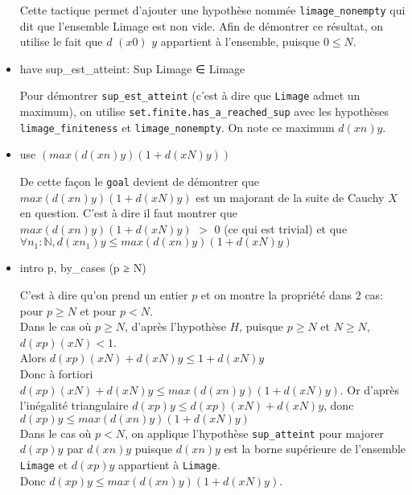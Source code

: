 \begin{itemize}
    
    Cette tactique permet d'ajouter une hypothèse nommée \texttt{limage\_nonempty} qui dit que l'ensemble Limage est non vide. Afin de démontrer ce résultat, on utilise le fait que $d$ $(x 0)$ $y$ appartient à l'ensemble, puisque $0 \leq N$.
    \item have sup\_est\_atteint: Sup Limage ∈ Limage
    
    
    Pour démontrer \texttt{sup\_est\_atteint} (c'est à dire que \texttt{Limage} admet un maximum), on utilise \texttt{set.finite.has\_a\_reached\_sup} avec les hypothèses \texttt{limage\_finiteness} et \texttt{limage\_nonempty}. On note ce maximum  $d (x n) y$.
    \item use $(max (d (x n) y) (1 + d (x N) y))$
    
    
    De cette façon le \texttt{goal} devient de démontrer que $max (d (x n) y) (1 + d (x N) y)$ est un majorant de la suite de Cauchy $X$ en question. C'est à dire il faut montrer que $max (d (x n) y) (1 + d (x N) y)$ $>$ $0$ (ce qui est trivial) et que $\forall n_1 : \mathbb{N}, d (xn_1) y \leq max (d (x n) y) (1 + d (x N) y)$
    \item intro p, by\_cases (p ≥ N)
    
    
    C'est à dire qu'on prend un entier $p$ et on montre la propriété dans 2 cas: pour $p \geq N$ et pour $p < N$. \\
    Dans le cas où $p \geq N$, d'après l'hypothèse $H$, puisque $p \geq N$ et $N \geq N$, $d (x p) (x N) < 1$. \\ Alors $d (x p) (x N) + d (x N) y \leq 1 + d (x N) y$ \\ Donc à fortiori $d (x p) (x N) + d (x N) y \leq max (d (x n) y) (1 + d (x N) y)$. Or d'après l'inégalité triangulaire $d (x p) y \leq d (x p) (x N) + d (x N) y$, donc $d (x p) y \leq max (d (x n) y) (1 + d (x N) y)$\\
    Dans le cas où $p < N$, on applique l'hypothèse \texttt{sup\_atteint} pour majorer $d (x p) y$ par $d (x n) y$ puisque $d (x n) y$ est la borne supérieure de l'ensemble \texttt{Limage} et $d (x p) y$ appartient à \texttt{Limage}.\\
    Donc $d (x p) y \leq max (d (x n) y) (1 + d (x N) y)$.
\end{itemize}
